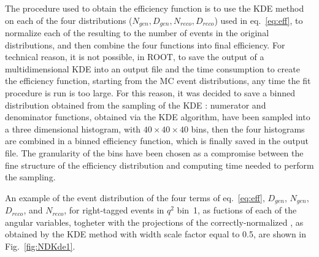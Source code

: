 The procedure used to obtain the efficiency function is to use the KDE method on each of the four distributions ($N_{gen}, D_{gen}, N_{reco}, D_{reco}$) used in eq.~\ref{eq:eff}, to normalize each of the resulting \pdfs to the number of events in the original distributions, and then combine the four functions into final efficiency.
For technical reason, it is not possible, in ROOT, to save the output of a multidimensional KDE \pdf into an output file and the time consumption to create the efficiency function, starting from the MC event distributions, any time the fit procedure is run is too large.
For this reason, it was decided to save a binned distribution obtained from the sampling of the KDE \pdfs: numerator and denominator functions, obtained via the KDE algorithm, have been sampled into a three dimensional histogram, with $40\times40\times40$ bins, then the four histograms are combined in a binned efficiency function, which is finally saved in the output file.
The granularity of the bins have been chosen as a compromise between the fine structure of the efficiency distribution and computing time needed to perform the \pdf sampling.

An example of the event distribution of the four terms of eq.~\ref{eq:eff}, $D_{gen}$, $N_{gen}$, $D_{reco}$, and $N_{reco}$, for right-tagged events in $q^2$ bin~1, as fuctions of each of the angular variables, togheter with the projections of the correctly-normalized \pdfs, as obtained by the KDE method with width scale factor equal to 0.5, are shown in Fig.~\ref{fig:NDKde1}.






